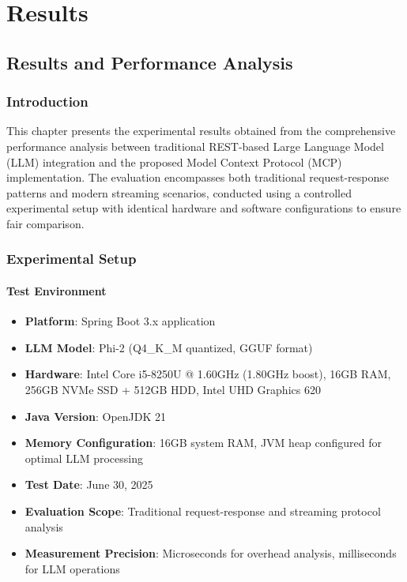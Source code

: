 \part{Results}

\chapter{Results and Performance Analysis}

\section{Introduction}

This chapter presents the experimental results obtained from the comprehensive performance analysis between traditional REST-based Large Language Model (LLM) integration and the proposed Model Context Protocol (MCP) implementation. The evaluation encompasses both traditional request-response patterns and modern streaming scenarios, conducted using a controlled experimental setup with identical hardware and software configurations to ensure fair comparison.

\section{Experimental Setup}

\subsection{Test Environment}

\begin{itemize}
    \item \textbf{Platform}: Spring Boot 3.x application
    \item \textbf{LLM Model}: Phi-2 (Q4\_K\_M quantized, GGUF format)
    \item \textbf{Hardware}: Intel Core i5-8250U @ 1.60GHz (1.80GHz boost), 16GB RAM, 256GB NVMe SSD + 512GB HDD, Intel UHD Graphics 620
    \item \textbf{Java Version}: OpenJDK 21
    \item \textbf{Memory Configuration}: 16GB system RAM, JVM heap configured for optimal LLM processing
    \item \textbf{Test Date}: June 30, 2025
    \item \textbf{Evaluation Scope}: Traditional request-response and streaming protocol analysis
    \item \textbf{Measurement Precision}: Microseconds for overhead analysis, milliseconds for LLM operations
\end{itemize}

